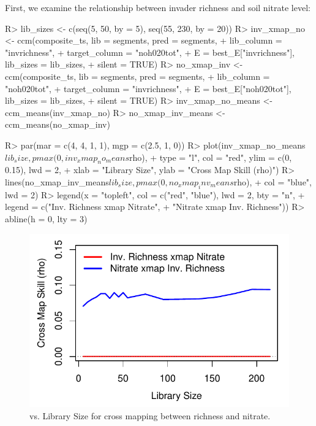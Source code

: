\documentclass[article]{jss}
\begin{document}
First, we examine the relationship between invader richness and soil nitrate level:
\begin{Schunk}
\begin{Sinput}
R> lib_sizes <- c(seq(5, 50, by = 5), seq(55, 230, by = 20))
R> inv_xmap_no <- ccm(composite_ts, lib = segments, pred = segments, 
+                     lib_column = "invrichness", 
+                     target_column = "noh020tot", 
+                     E = best_E["invrichness"], lib_sizes = lib_sizes, 
+                     silent = TRUE)
R> no_xmap_inv <- ccm(composite_ts, lib = segments, pred = segments, 
+                     lib_column = "noh020tot", 
+                     target_column = "invrichness", 
+                     E = best_E["noh020tot"], lib_sizes = lib_sizes, 
+                     silent = TRUE)
R> inv_xmap_no_means <- ccm_means(inv_xmap_no)
R> no_xmap_inv_means <- ccm_means(no_xmap_inv)
\end{Sinput}
\end{Schunk}

\begin{Schunk}
\begin{Sinput}
R> par(mar = c(4, 4, 1, 1), mgp = c(2.5, 1, 0))
R> plot(inv_xmap_no_means$lib_size, pmax(0, inv_xmap_no_means$rho), 
+       type = "l", col = "red", ylim = c(0, 0.15), lwd = 2, 
+       xlab = "Library Size", ylab = "Cross Map Skill (rho)")
R> lines(no_xmap_inv_means$lib_size, pmax(0, no_xmap_inv_means$rho), 
+        col = "blue", lwd = 2)
R> legend(x = "topleft", col = c("red", "blue"), lwd = 2, bty = "n", 
+         legend = c("Inv. Richness xmap Nitrate", 
+                    "Nitrate xmap Inv. Richness"))
R> abline(h = 0, lty = 3)
\end{Sinput}
\end{Schunk}

\begin{figure}[t!]
\begin{center}
\includegraphics[width=4.5in]{article-ccm-e120-inv-no}
\end{center}
\caption{\label{fig:ccm-e120-inv-no}  vs. Library Size for cross mapping between richness and nitrate.}
\end{figure}
\end{document}
